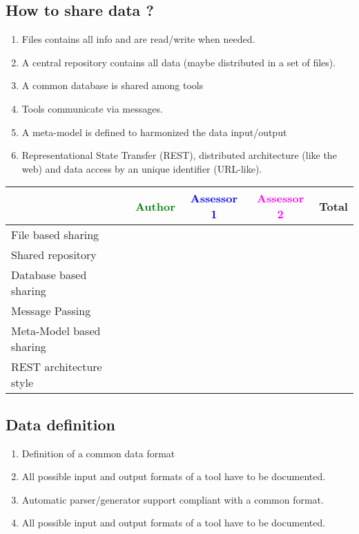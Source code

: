 \subsection{How to share data ?}
\begin{enumerate}
\item Files contains all info and are read/write when needed.
\item A central repository contains all data (maybe distributed in a
  set of files).
\item A common database is shared among tools
\item Tools communicate via messages.
\item A meta-model is defined to harmonized the data input/output
\item Representational State Transfer (REST), distributed architecture (like the web) and data access by an
  unique identifier (URL-like).
\end{enumerate}
\begin{tabular}{|l | c | c | c | c|} \hline
  & \textcolor{green}{Author} & \textcolor{blue}{Assessor 1} &  \textcolor{magenta}{Assessor 2} & Total \\
  \hline File based sharing &
  &                 &                  &\\
  \hline Shared repository &
  &                 &                  &\\
  \hline Database based sharing&
  &                 &                  &\\
  \hline Message Passing&
  &                 &                  &\\
  \hline Meta-Model based sharing &
  &                 &                  &\\
  \hline REST architecture style &
  &                 &                  &\\
  \hline
\end{tabular}


\subsection{Data definition}
\begin{enumerate}
\item Definition of a common data format
\item All possible input and output formats of a tool have to be
  documented.
\item Automatic parser/generator support compliant with a common format.
\item All possible input and output formats of a tool have to be documented.
\end{enumerate}

